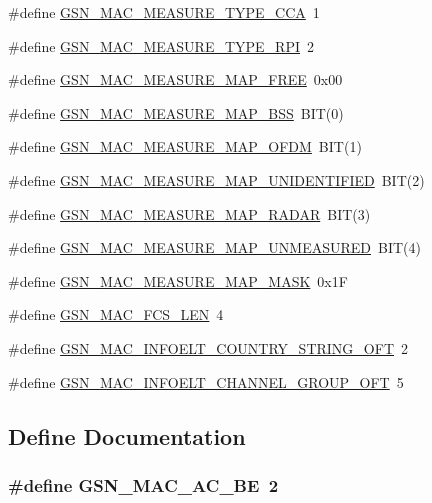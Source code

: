 \begin{DoxyCompactItemize}
\item 
\#define \hyperlink{a00523_a0ef016e277536b17262a24c166904ae8}{GSN\_\-MAC\_\-MEASURE\_\-TYPE\_\-CCA}~1
\item 
\#define \hyperlink{a00523_a7972a28ee343a6c0b157ce8080d27d5c}{GSN\_\-MAC\_\-MEASURE\_\-TYPE\_\-RPI}~2
\item 
\#define \hyperlink{a00523_a56033553d909fc49f89399c963086564}{GSN\_\-MAC\_\-MEASURE\_\-MAP\_\-FREE}~0x00
\item 
\#define \hyperlink{a00523_ab86283d994d2598f6f16aa9c93426950}{GSN\_\-MAC\_\-MEASURE\_\-MAP\_\-BSS}~BIT(0)
\item 
\#define \hyperlink{a00523_a54d4c662a5d471193323c879398e78ab}{GSN\_\-MAC\_\-MEASURE\_\-MAP\_\-OFDM}~BIT(1)
\item 
\#define \hyperlink{a00523_abfaaf646292ca7fad099c48f3bda8966}{GSN\_\-MAC\_\-MEASURE\_\-MAP\_\-UNIDENTIFIED}~BIT(2)
\item 
\#define \hyperlink{a00523_a1d623be22401bb5fc2968e007a3b0720}{GSN\_\-MAC\_\-MEASURE\_\-MAP\_\-RADAR}~BIT(3)
\item 
\#define \hyperlink{a00523_a476d0c3de5d9e04f86c10a0772c2c9b5}{GSN\_\-MAC\_\-MEASURE\_\-MAP\_\-UNMEASURED}~BIT(4)
\item 
\#define \hyperlink{a00523_a8dfbf547e36ce725b3eb1dd33be5ef82}{GSN\_\-MAC\_\-MEASURE\_\-MAP\_\-MASK}~0x1F
\item 
\#define \hyperlink{a00523_a54e769a6cd33364460bdbfae522b30e6}{GSN\_\-MAC\_\-FCS\_\-LEN}~4
\item 
\#define \hyperlink{a00523_a3dbf370f9cb30037ac562031989121d9}{GSN\_\-MAC\_\-INFOELT\_\-COUNTRY\_\-STRING\_\-OFT}~2
\item 
\#define \hyperlink{a00523_a87c4ce61a21ec81c8efc8afa89f5ee23}{GSN\_\-MAC\_\-INFOELT\_\-CHANNEL\_\-GROUP\_\-OFT}~5
\end{DoxyCompactItemize}


\subsection{Define Documentation}
\hypertarget{a00523_a231bc7c7b58a9acfdd495ab705397bbc}{
\subsubsection[{GSN\_\-MAC\_\-AC\_\-BE}]{\setlength{\rightskip}{0pt plus 5cm}\#define GSN\_\-MAC\_\-AC\_\-BE~2}}
\label{a00523_a231bc7c7b58a9acfdd495ab705397bbc}


